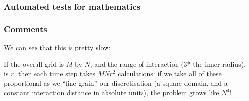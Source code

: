 \subsubsection{Automated tests for
mathematics}\label{automated-tests-for-mathematics}

\begin{Shaded}
\begin{Highlighting}[]

       
\end{Highlighting}
\end{Shaded}

\begin{Shaded}
\begin{Highlighting}[]

  \NormalTok{) \{}
     \NormalTok{);}
    \NormalTok{, }\NormalTok{, }\NormalTok{) == }\NormalTok{);}
    \NormalTok{, }\NormalTok{, } \NormalTok{);}
    \NormalTok{, }\NormalTok{, }\NormalTok{) == }\NormalTok{);}
    \NormalTok{, }\NormalTok{, }\NormalTok{)) < }\NormalTok{);}
  \NormalTok{\}}
\end{Highlighting}
\end{Shaded}

\subsubsection{Comments}\label{comments-1}

We can see that this is pretty slow:

If the overall grid is $M$ by $N$, and the range of interaction (3* the
inner radius), is $r$, then each time step takes $MNr^2$ calculations:
if we take all of these proportional as we ``fine grain'' our
discretisation (a square domain, and a constant interaction distance in
absolute units), the problem grows like $N^4$!

